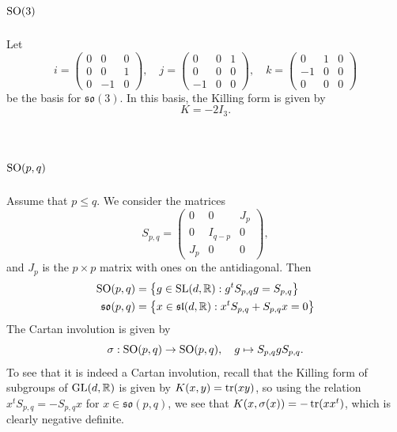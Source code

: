 \documentclass{report}
\begin{document}
\section{$\operatorname{{\mathrm{SO}}}(3)$}
Let
\[
i = \begin{pmatrix}
    0 & 0 & 0\\
    0 & 0 & 1\\
    0 & -1 & 0
\end{pmatrix}, \quad j = \begin{pmatrix}
    0 & 0 & 1\\
    0 & 0 & 0\\
    -1 & 0 & 0
\end{pmatrix}, \quad k = \begin{pmatrix}
    0 & 1 & 0\\
    -1 & 0 & 0\\
    0 & 0 & 0
\end{pmatrix}
\]
be the basis for $\mathfrak{so}(3)$.
In this basis, the Killing form is given by 
\[
K = - 2I_3.
\]

\section{$\operatorname{{\mathrm{SO}}}(p,q)$}
Assume that $p \leq q$.
We consider the matrices
\[
S_{p,q} = \begin{pmatrix} 
    0 & 0 & J_p \\ 
    0 & I_{q-p} & 0\\
    J_p & 0 & 0
\end{pmatrix},
\]
and $J_p$ is the $p \times p$ matrix with ones on the antidiagonal.
Then
\begin{align*}
    \operatorname{{\mathrm{SO}}}(p,q) &= \left\{ g \in \operatorname{{\mathrm{SL}}}(d, \mathbb R) : g^t S_{p,q} g = S_{p,q} \right\}\\
    \mathfrak{so}(p,q) &= \left\{ x \in \mathfrak{sl}(d, \mathbb R) : x^t S_{p,q} + S_{p,q}x = 0 \right\}
\end{align*}
The Cartan involution is given by 
\[
\sigma: \operatorname{{\mathrm{SO}}}(p,q) \to \operatorname{{\mathrm{SO}}}(p,q), \quad g \mapsto S_{p,q} g S_{p,q}.
\]
To see that it is indeed a Cartan involution, recall that the Killing form of subgroups of $\operatorname{{\mathrm{GL}}}(d, \mathbb R)$ is given by $K(x,y) = \operatorname{tr}(xy)$, so using the relation $x^t S_{p,q} = - S_{p,q}x$ for $x \in \mathfrak{so}(p,q)$, we see that $K(x, \sigma(x)) = - \operatorname{tr}(x x^t)$, which is clearly negative definite.
\end{document}

